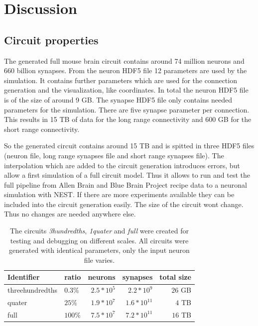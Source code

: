 %

\chapter{Discussion}

\section{Circuit properties}


The generated full mouse brain circuit contains around 74 million neurons and 660 billion synapses.
From the neuron HDF5 file 12 parameters are used by the simulation.
It contains further parameters which are used for the connection generation and the visualization,
like coordinates. In total the neuron HDF5 file is of the size of around 9 GB.
The synapse HDF5 file only contains needed parameters for the simulation.
There are five synapse parameter per connection. This results in 15 TB of data
for the long range connectivity and 600 GB for the short range connectivity.

So the generated circuit contains around 15 TB and is spitted in three HDF5 files (neuron file, long range synapses file and short range synapses file). The interpolation which are added to the circuit generation introduces errors, but allow
a first simulation of a full circuit model. Thus it allows to run and test the full
pipeline from Allen Brain and Blue Brain Project recipe data to a neuronal simulation with NEST.
If there are more experiments available they can be included into
the circuit generation easily. The size of the circuit wont change. Thus no changes are needed anywhere else.


\begin{table}[ht!]
\begin{centering}
    \begin{tabular}{ | l | l | r | r | r |}
    \hline
    Identifier & ratio & neurons & synapses & total size \\ \hline \hline
    threehundredths & $0.3\%$ & $~2.5*10^5$ & $~2.2*10^9$ & $~26$ GB \\ \hline
    quater & $25\%$ & $~1.9*10^7$ & $~1.6*10^{11}$ & $~4$ TB \\ \hline
    full & $100\%$ & $~7.5*10^7$ & $~7.2*10^{11}$ & $~16$ TB \\ \hline
    \end{tabular}
    \caption{The circuits \emph{3hundredths}, \emph{1quater} and \emph{full} were created for testing and debugging on different scales.
All circuits were generated with identical parameters, only the input neuron file varies.}
\end{centering}
    \end{table}


